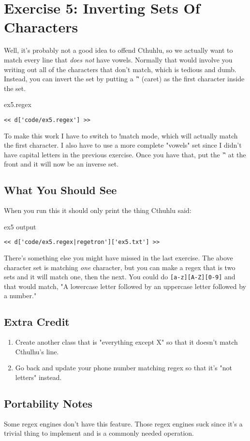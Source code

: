\chapter{Exercise 5: Inverting Sets Of Characters}

Well, it's probably not a good idea to offend Cthuhlu, so we actually want
to match every line that \emph{does not} have vowels.  Normally that would
involve you writing out all of the characters that don't match, which is
tedious and dumb.  Instead, you can invert the set by putting a '\^' (caret)
as the first character inside the set.

\begin{code}{ex5.regex}
\begin{Verbatim}
<< d['code/ex5.regex'] >>
\end{Verbatim}
\end{code}

To make this work I have to switch to !match mode, which will actually
match the first character.  I also have to use a more complete "vowels"
set since I didn't have capital letters in the previous exercise.  Once
you have that, put the '\^' at the front and it will now be an inverse
set.

\section{What You Should See}

When you run this it should only print the thing Cthuhlu said:

\begin{code}{ex5 output}
\begin{Verbatim}
<< d['code/ex5.regex|regetron']['ex5.txt'] >>
\end{Verbatim}
\end{code}

There's something else you might have missed in the last exercise.
The above character set is matching \emph{one} character, but you can
make a regex that is two sets and it will match one, then the next.
You could do \verb|[a-z][A-Z][0-9]| and that would match, "A lowercase
letter followed by an uppercase letter followed by a number."

\section{Extra Credit}

\begin{enumerate}
\item Create another class that is "everything except X" so that it
    doesn't match Cthulhu's line.
\item Go back and update your phone number matching regex so that it's
    "not letters" instead.
\end{enumerate}

\section{Portability Notes}

Some regex engines don't have this feature. Those regex engines suck
since it's a trivial thing to implement and is a commonly needed operation.

